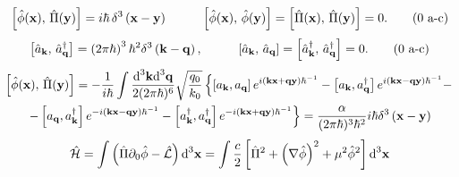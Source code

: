 \begin{subequations}
	\begin{gather}
		\left[\hat{\phi}(\mathbf{x}),\,\hat{\Pi}(\mathbf{y})\right]=i\hbar \,\delta^3\left(\mathbf{x}-\mathbf{y}\right)\hspace{1.0cm}\left[\hat{\phi}(\mathbf{x}),\,\hat{\phi}(\mathbf{y})\right]=\left[\hat{\Pi}(\mathbf{x}),\,\hat{\Pi}(\mathbf{y})\right]=0.\tag{\theequation \,\,a-c}
	\end{gather}
\end{subequations}
\begin{subequations}\label{eq: general a operator commutator rules}
	\begin{gather}
		\left[\hat{a}_\mathbf{k},\,\hat{a}_\mathbf{q}^\dagger\right]=\left(2\pi\hbar\right)^3\hbar^2 \delta^3\left(\mathbf{k}-\mathbf{q}\right),\hspace{1.0cm}\left[\hat{a}_\mathbf{k},\,\hat{a}_\mathbf{q}\right]=\left[\hat{a}_\mathbf{k}^\dagger,\,\hat{a}_\mathbf{q}^\dagger\right]=0.\tag{\theequation \,\,a-c}
	\end{gather}
\end{subequations}
\begin{multline}
	\left[\hat{\phi}(\mathbf{x}),\,\hat{\Pi}(\mathbf{y})\right]=-\frac{1}{i\hbar}\int\frac{\text{d}^3\mathbf{k}\text{d}^3\mathbf{q}}{2(2\pi\hbar)^6}\sqrt{\frac{q_0}{k_0}}	\left\{\left[a_\mathbf{k},a_\mathbf{q}\right]e^{i\left(\mathbf{kx}+\mathbf{qy}\right)\hbar^{-1}}-\left[a_\mathbf{k},a_\mathbf{q}^\dagger\right]e^{i\left(\mathbf{kx}-\mathbf{qy}\right)\hbar^{-1}}-\right.\\
	\left.-\left[a_\mathbf{q},a_\mathbf{k}^\dagger\right]e^{-i\left(\mathbf{kx}-\mathbf{qy}\right)\hbar^{-1}}-\left[a_\mathbf{k}^\dagger,a_\mathbf{q}^\dagger\right]e^{-i\left(\mathbf{kx}+\mathbf{qy}\right)\hbar^{-1}}\right\}=\frac{\alpha}{(2\pi\hbar)^3\hbar^2 }i\hbar\delta^3\left(\mathbf{x}-\mathbf{y}\right)
\end{multline}
\begin{equation}
	\hat{\mathcal{H}}=\int\left(\hat{\Pi}\partial_{0}\hat{\phi}-\hat{\mathcal{L}}\right)\text{d}^3\mathbf{x}=\int\frac{c}{2}\left[\hat{\Pi}^2+\left(\mathbf{\nabla}\hat{\phi}\right)^2+\mu^2\hat{\phi}^2\right]\text{d}^3\mathbf{x}
\end{equation}